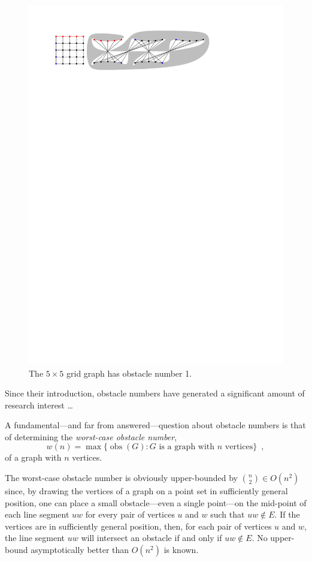 \documentclass{patmorin}
\DeclareMathOperator{\obs}{obs}
\begin{document}
\begin{figure}
  \begin{center}
    \includegraphics{fivebyfive}
  \end{center}  
  \caption{The $5\times 5$ grid graph has obstacle number 1.}
\end{figure}

Since their introduction, obstacle numbers have generated a significant
amount of research interest \ldots {}

A fundamental---and far from answered---question about obstacle numbers
is that of determining the \emph{worst-case obstacle number},
\[
    w(n) = \max \{\obs(G) :\mbox{$G$ is a graph with $n$ vertices}\}
    \enspace ,
\] 
of a graph with $n$ vertices.

The worst-case obstacle number is obviously upper-bounded by
$\binom{n}{2}\in O(n^2)$ since, by drawing the vertices of a graph
 on a point set in sufficiently general position, one can place
a small obstacle---even a single point---on the mid-point of each
line segment $uw$ for every pair of vertices $u$ and $w$ such that
$uw\not\in E$.  If the vertices are in sufficiently general position,
then, for each pair of vertices $u$ and $w$, the line segment $uw$ will
intersect an obstacle if and only if $uw\not\in E$.  No upper-bound
asymptotically better than $O(n^2)$ is known.
\end{document}
